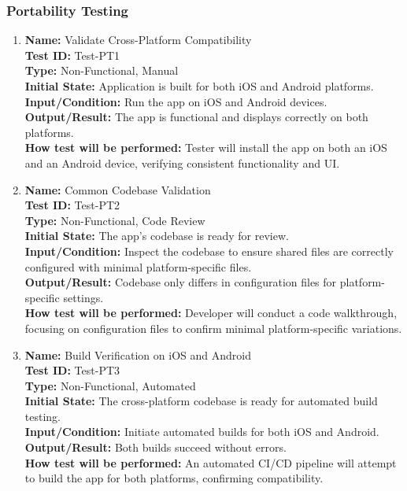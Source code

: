 \documentclass[12pt, titlepage]{article}
\begin{document}
\subsubsection{Portability Testing}

\begin{enumerate}

    \item \textbf{Name:} Validate Cross-Platform Compatibility \label{itm:Test-PT1} \\
    \textbf{Test ID:} Test-PT1 \\
    \textbf{Type:} Non-Functional, Manual \\
    \textbf{Initial State:} Application is built for both iOS and Android platforms. \\
    \textbf{Input/Condition:} Run the app on iOS and Android devices. \\
    \textbf{Output/Result:} The app is functional and displays correctly on both platforms. \\
    \textbf{How test will be performed:} Tester will install the app on both an iOS and an Android device, verifying consistent functionality and UI.

    \item \textbf{Name:} Common Codebase Validation \label{itm:Test-PT2} \\
    \textbf{Test ID:} Test-PT2 \\
    \textbf{Type:} Non-Functional, Code Review \\
    \textbf{Initial State:} The app’s codebase is ready for review. \\
    \textbf{Input/Condition:} Inspect the codebase to ensure shared files are correctly configured with minimal platform-specific files. \\
    \textbf{Output/Result:} Codebase only differs in configuration files for platform-specific settings. \\
    \textbf{How test will be performed:} Developer will conduct a code walkthrough, focusing on configuration files to confirm minimal platform-specific variations.

    \item \textbf{Name:} Build Verification on iOS and Android \label{itm:Test-PT3} \\
    \textbf{Test ID:} Test-PT3 \\
    \textbf{Type:} Non-Functional, Automated \\
    \textbf{Initial State:} The cross-platform codebase is ready for automated build testing. \\
    \textbf{Input/Condition:} Initiate automated builds for both iOS and Android. \\
    \textbf{Output/Result:} Both builds succeed without errors. \\
    \textbf{How test will be performed:} An automated CI/CD pipeline will attempt to build the app for both platforms, confirming compatibility.

\end{enumerate}
\end{document}
